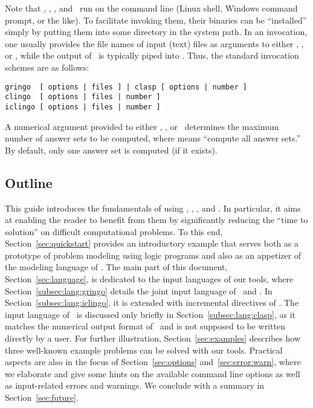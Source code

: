 Note that \gringo, \clasp, \clingo, and \iclingo\ 
run on the command line (Linux shell, Windows command prompt, or the like).
To facilitate invoking them, their binaries can be ``installed''
simply by putting them into some directory in the system path.
In an invocation,
one usually provides the file names of input (text) files 
as arguments to either \gringo, \clingo, or \iclingo,
while the output of \gringo\ is typically piped into \clasp.
Thus, the standard invocation schemes are as follows:
\begin{lstlisting}[numbers=none]
gringo  [ options | files ] | clasp [ options | number ]
clingo  [ options | files | number ]
iclingo [ options | files | number ]
\end{lstlisting}
A numerical argument provided to either \clasp, \clingo, or \iclingo\
determines the maximum number of answer sets to be computed,
where \code{0} %
means ``compute all answer sets.''
By default, only one answer set is computed (if it exists).

\subsection{Outline}

This guide introduces the fundamentals of using
\gringo, \clasp, \clingo, and \iclingo.
In particular, it aims at enabling the reader to benefit from them
by significantly reducing the ``time to solution'' on difficult computational problems.
To this end,
Section~\ref{sec:quickstart}
provides an introductory example 
that serves both as a prototype of problem modeling using logic programs
and also as an appetizer of the modeling language of \gringo.
The main part of this document, Section~\ref{sec:language},
is dedicated to the input languages of our tools,
where Section~\ref{subsec:lang:gringo}
details the joint input language of \gringo\ and \clingo.
In Section~\ref{subsec:lang:iclingo}, it is extended with
incremental directives of \iclingo.
The input language of \clasp\ is discussed only briefly in Section~\ref{subsec:lang:clasp},
as it matches the numerical output format of \gringo\ and
is not supposed to be written directly by a user.
For %
further illustration,
Section~\ref{sec:examples} describes how three well-known example problems
can be solved with our tools.
Practical aspects are also in the focus of Section~\ref{sec:options} and~\ref{sec:error:warn},
where we elaborate and give some hints on the available command line options
as well as input-related errors and warnings. %
We conclude with a summary in Section~\ref{sec:future}.

